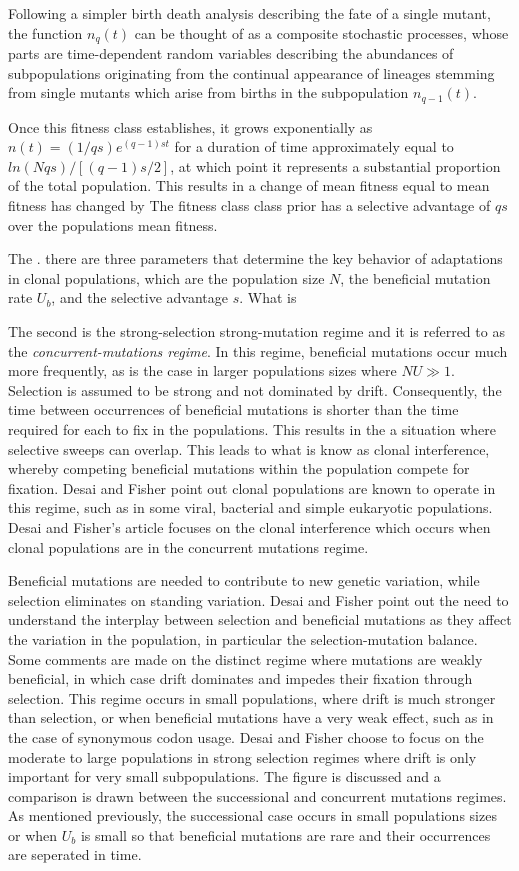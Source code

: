 \documentclass[12pt]{article}
\begin{document}
Following a simpler birth death analysis describing the fate of a single mutant, the function $n_q(t)$ can be thought of as a composite stochastic processes, whose parts are time-dependent random variables describing the abundances of subpopulations originating from the continual appearance of lineages stemming from single mutants which arise from births in the subpopulation $n_{q-1}(t)$.  

Once this fitness class establishes, it grows exponentially as $n(t)=(1/qs)e^{(q-1)st}$ for a duration of time approximately equal to $ln(Nqs)/[(q-1)s/2]$, at which point it represents a substantial proportion of the total population.  This results in a change of mean fitness equal to  mean fitness has changed by  The fitness class class prior has a selective advantage of $qs$ over the populations mean fitness.

The . there are three parameters that determine the key behavior of adaptations in clonal populations, which are the population size $N$, the beneficial mutation rate $U_b$, and the selective advantage $s$.  What is  

The second is the strong-selection strong-mutation regime and it is referred to as the \textit{concurrent-mutations regime}. In this regime, beneficial mutations occur much more frequently, as is the case in larger populations sizes where $NU \gg 1$.  Selection is assumed to be strong and not dominated by drift.  Consequently, the time between occurrences of beneficial mutations is shorter than the time required for each to fix in the populations.  This results in the a situation where selective sweeps can overlap. This leads to what is know as clonal interference, whereby competing beneficial mutations within the population compete for fixation. Desai and Fisher point out clonal populations are known to operate in this regime, such as in some viral, bacterial and simple eukaryotic populations.  Desai and Fisher's article focuses on the clonal interference which occurs when clonal populations are in the concurrent mutations regime.  

Beneficial mutations are needed to contribute to new genetic variation, while selection eliminates on standing variation.  Desai and Fisher point out the need to understand the interplay between selection and beneficial mutations as they affect the variation in the population, in particular the selection-mutation balance.  Some comments are made on the distinct regime where mutations are weakly beneficial, in which case drift dominates and impedes their fixation through selection.  This regime occurs in small populations, where drift is much stronger than selection, or when beneficial mutations have a very weak effect, such as in the case of synonymous codon usage.  Desai and Fisher choose to focus on the moderate to large populations in strong selection regimes where drift is only important for very small subpopulations.  The figure is discussed and a comparison is drawn between the successional and concurrent mutations regimes.  As mentioned previously, the successional case occurs in small populations sizes or when $U_b$ is small so that beneficial mutations are rare and their occurrences are seperated in time.
\end{document}
